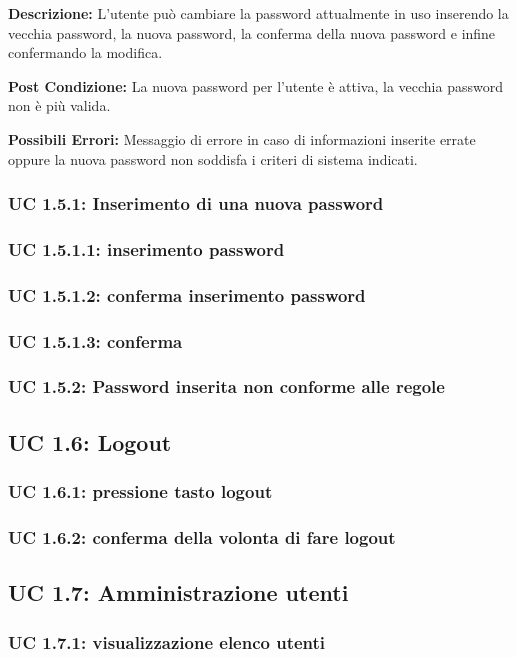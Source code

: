 \textbf{Descrizione:}
L'utente può cambiare la password attualmente in uso inserendo la vecchia password, la nuova password, la conferma della nuova password e infine confermando la modifica.

\textbf{Post Condizione:}
La nuova password per l'utente è attiva, la vecchia password non è più valida.

\textbf{Possibili Errori:}
Messaggio di errore in caso di informazioni inserite errate oppure la nuova password non soddisfa i criteri di sistema indicati.

\subsubsection{UC 1.5.1: Inserimento di una nuova password}
\subsubsection{UC 1.5.1.1: inserimento password}
\subsubsection{UC 1.5.1.2: conferma inserimento password }
\subsubsection{UC 1.5.1.3: conferma}
\subsubsection{UC 1.5.2: Password inserita non conforme alle regole}

\subsection{UC 1.6: Logout}
\subsubsection{UC 1.6.1: pressione tasto logout}
\subsubsection{UC 1.6.2: conferma della volonta di fare logout}

\subsection{UC 1.7: Amministrazione utenti}
\subsubsection{UC 1.7.1: visualizzazione elenco utenti}
